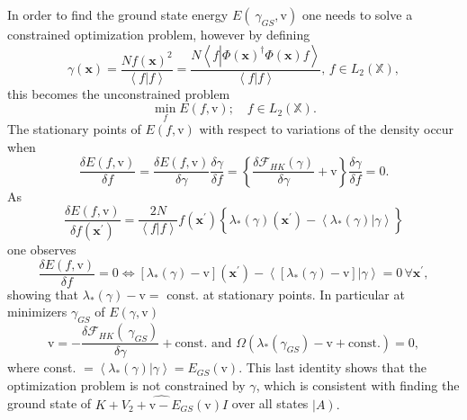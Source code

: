 \documentclass[aps,preprint]{revtex4}%
\begin{document}
In order to find the ground state energy $E\left(  \ \gamma_{GS}%
\mathbf{,}\mathrm{v}\right)  $ one needs to solve a constrained optimization
problem, however by defining
\begin{equation}
\gamma\left(  \mathbf{x}\right)  =\frac{Nf\left(  \mathbf{x}\right)  ^{2}%
}{\left\langle f|f\right\rangle }=\frac{N\left\langle f\left\vert \Phi\left(
\mathbf{x}\right)  ^{\dagger}\Phi\left(  \mathbf{x}\right)  f\right.
\right\rangle }{\left\langle f|f\right\rangle },\,f\in L_{2}\left(
\mathbb{X}\right)  ,
\end{equation}
this becomes the unconstrained problem
\begin{equation}
\min_{f}E\left(  f\mathbf{,}\mathrm{v}\right)  ;\quad f\in L_{2}\left(
\mathbb{X}\right)  .
\end{equation}
The stationary points of $E\left(  f\mathbf{,}\mathrm{v}\right)  $ with
respect to variations of the density occur when
\begin{equation}
\frac{\delta E\left(  f\mathbf{,}\mathrm{v}\right)  }{\delta f}=\frac{\delta
E\left(  f\mathbf{,}\mathrm{v}\right)  }{\delta\gamma}\frac{\delta\gamma
}{\delta f}=\left\{  \frac{\delta\mathcal{F}_{HK}\left(  \gamma\right)
}{\delta\gamma}+\mathrm{v}\right\}  \frac{\delta\gamma}{\delta f}=0.
\end{equation}
As
\begin{equation}
\frac{\delta E\left(  f\mathbf{,}\mathrm{v}\right)  }{\delta f\left(
\mathbf{x}^{\prime}\right)  }=\frac{2N}{\left\langle f|f\right\rangle
}f\left(  \mathbf{x}^{\prime}\right)  \left\{  \overset{}{\lambda_{\ast
}\left(  \gamma\right)  \left(  \mathbf{x}^{\prime}\right)  -\left\langle
\left.  \lambda_{\ast}\left(  \gamma\right)  \right\vert \gamma\right\rangle
}\right\}
\end{equation}
one observes
\begin{equation}
\frac{\delta E\left(  f\mathbf{,}\mathrm{v}\right)  }{\delta f}%
=0\Leftrightarrow\left[  \lambda_{\ast}\left(  \gamma\right)  -\mathrm{v}%
\right]  \left(  \mathbf{x}^{\prime}\right)  -\left\langle \left.  \left[
\lambda_{\ast}\left(  \gamma\right)  -\mathrm{v}\right]  \right\vert
\gamma\right\rangle =0\,\forall\mathbf{x}^{\prime},
\end{equation}
showing that $\lambda_{\ast}\left(  \gamma\right)  -\mathrm{v}=$ const. at
stationary points. In particular at minimizers $\gamma_{GS}$ of $E\left(
\gamma\mathbf{,}\mathrm{v}\right)  $
\begin{equation}
\mathrm{v}=-\frac{\delta\mathcal{F}_{HK}\left(  \ \gamma_{GS}\right)  }%
{\delta\gamma}+\text{const. and }\Omega\left(  \lambda_{\ast}\left(
\gamma_{GS}\right)  -\mathrm{v}+\text{const.}\right)  =0,
\end{equation}
where const. $=\left\langle \left.  \lambda_{\ast}\left(  \gamma\right)
\right\vert \gamma\right\rangle =E_{GS}\left(  \mathrm{v}\right)  .$ This last
identity shows that the optimization problem is not constrained by $\gamma$,
which is consistent with finding the ground state of $\widehat{K+V_{2}%
+\mathrm{v}-E_{GS}\left(  \mathrm{v}\right)  I}$ over all states $\left\vert
A\right)  .$
\end{document}
